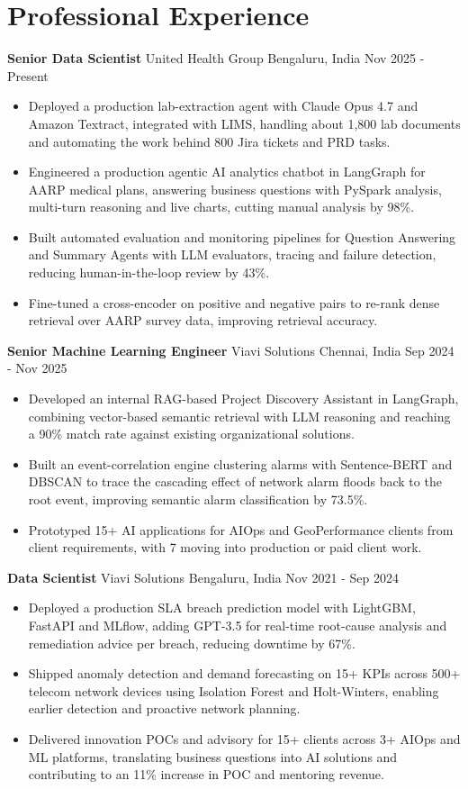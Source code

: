 \documentclass[10pt,a4paper]{article}
\newcommand{\role}[4]{\textbf{#1} \textbar{} #2 \hfill #3 \textbar{} #4\par}
\begin{document}
\section{Professional Experience}
\role{Senior Data Scientist}{United Health Group}{Bengaluru, India}{Nov 2025 - Present}
\begin{itemize}
  \item Deployed a production lab-extraction agent with Claude Opus 4.7 and Amazon Textract, integrated with LIMS, handling about 1,800 lab documents and automating the work behind 800 Jira tickets and PRD tasks.
  \item Engineered a production agentic AI analytics chatbot in LangGraph for AARP medical plans, answering business questions with PySpark analysis, multi-turn reasoning and live charts, cutting manual analysis by 98\%.
  \item Built automated evaluation and monitoring pipelines for Question Answering and Summary Agents with LLM evaluators, tracing and failure detection, reducing human-in-the-loop review by 43\%.
  \item Fine-tuned a cross-encoder on positive and negative pairs to re-rank dense retrieval over AARP survey data, improving retrieval accuracy.
\end{itemize}
\vspace{3pt}
\role{Senior Machine Learning Engineer}{Viavi Solutions}{Chennai, India}{Sep 2024 - Nov 2025}
\begin{itemize}
  \item Developed an internal RAG-based Project Discovery Assistant in LangGraph, combining vector-based semantic retrieval with LLM reasoning and reaching a 90\% match rate against existing organizational solutions.
  \item Built an event-correlation engine clustering alarms with Sentence-BERT and DBSCAN to trace the cascading effect of network alarm floods back to the root event, improving semantic alarm classification by 73.5\%.
  \item Prototyped 15+ AI applications for AIOps and GeoPerformance clients from client requirements, with 7 moving into production or paid client work.
\end{itemize}
\vspace{3pt}
\role{Data Scientist}{Viavi Solutions}{Bengaluru, India}{Nov 2021 - Sep 2024}
\begin{itemize}
  \item Deployed a production SLA breach prediction model with LightGBM, FastAPI and MLflow, adding GPT-3.5 for real-time root-cause analysis and remediation advice per breach, reducing downtime by 67\%.
  \item Shipped anomaly detection and demand forecasting on 15+ KPIs across 500+ telecom network devices using Isolation Forest and Holt-Winters, enabling earlier detection and proactive network planning.
  \item Delivered innovation POCs and advisory for 15+ clients across 3+ AIOps and ML platforms, translating business questions into AI solutions and contributing to an 11\% increase in POC and mentoring revenue.
\end{itemize}
\end{document}
